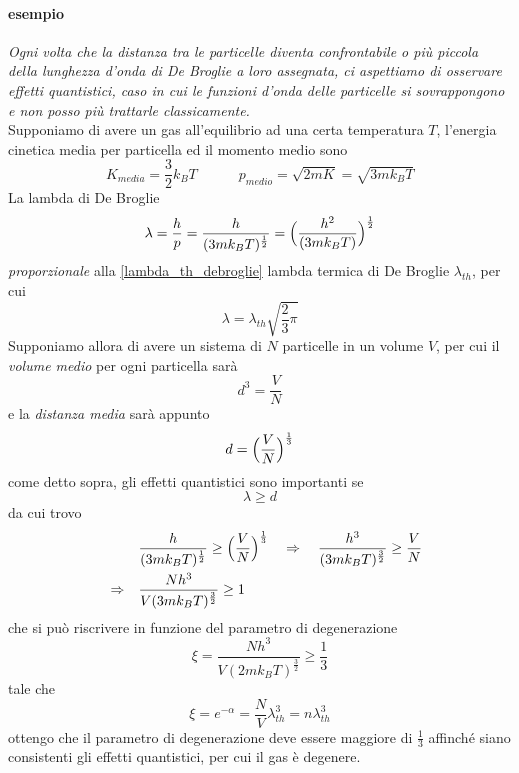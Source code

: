 \paragraph{esempio}
\textit{Ogni volta che la distanza tra le particelle diventa confrontabile o più piccola della lunghezza d'onda di De Broglie a loro assegnata, ci aspettiamo di osservare effetti quantistici, caso in cui le funzioni d'onda delle particelle si sovrappongono e non posso più trattarle classicamente.} \\
Supponiamo di avere un gas all'equilibrio ad una certa temperatura $T$, l'energia cinetica media per particella ed il momento medio sono
\begin{equation}
K_{media} = \frac{3}{2} k_B T
\quad\quad\quad
p_{medio} = \sqrt{2mK} = \sqrt{3 m k_B T}
\end{equation}
La lambda di De Broglie
\begin{equation}
\lambda = \frac{h}{p} 
= \frac{h}{(3mk_B T)^{ \frac{1}{2} }}
= \Bigl(  \frac{h^2}{(3mk_B T)}  \Bigr)^{ \frac{1}{2} }
\end{equation}
\textit{proporzionale} alla \ref{lambda_th_debroglie} lambda termica di De Broglie $\lambda_{th}$, per cui
\begin{equation}
\lambda = \lambda_{th} \sqrt{\frac{2}{3}\pi} 
\end{equation}
Supponiamo allora di avere un sistema di $N$ particelle in un volume $V$, per cui il \textit{volume medio} per ogni particella sarà
\begin{equation}
d^3 = \frac{V}{N}
\end{equation}
e la \textit{distanza media} sarà appunto
\begin{equation}
d = \Bigl(   \frac{V}{N}  \Bigr)^{\frac{1}{3}}
\end{equation}
come detto sopra, gli effetti quantistici sono importanti se
\begin{equation}
\lambda \ge d
\end{equation}
da cui trovo
\begin{equation}
\begin{split}
& \frac{h}{(3mk_B T)^{ \frac{1}{2} }} \ge \Bigl(   \frac{V}{N}  \Bigr)^{\frac{1}{3}} \quad\Rightarrow\quad \frac{h^3}{(3mk_B T)^{ \frac{3}{2} }} \ge \frac{V}{N}  \\
\quad\Rightarrow\quad & \frac{N h^3}{V(3mk_B T)^{ \frac{3}{2} }} \ge 1 
\end{split}
\end{equation}
che si può riscrivere in funzione del parametro di degenerazione
\begin{equation}
\xi = \frac{N h^3}{V(2mk_B T)^{ \frac{3}{2} }} \ge \frac{1}{3} 
\end{equation}
tale che 
\begin{equation}
\xi = e^{ -\alpha } =\frac{N}{V} \lambda_{th}^3 = n \lambda_{th}^3
\end{equation}
ottengo che il parametro di degenerazione deve essere maggiore di $\frac{1}{3}$ affinché siano consistenti gli effetti quantistici, per cui il gas è degenere.

